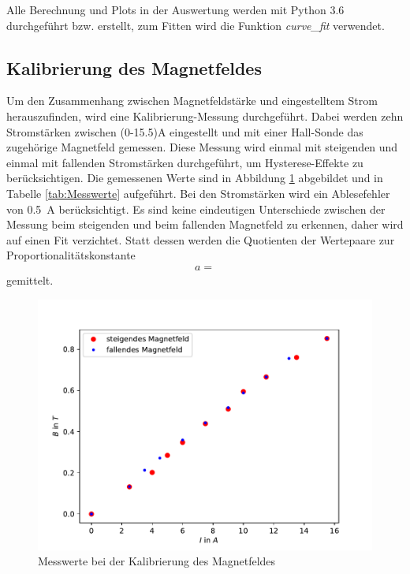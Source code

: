 Alle Berechnung und Plots in der Auswertung werden mit Python 3.6 durchgeführt bzw. erstellt, zum Fitten wird die Funktion \textit{curve\_fit} verwendet.

\subsection{Kalibrierung des Magnetfeldes}
Um den Zusammenhang zwischen Magnetfeldstärke und eingestelltem Strom herauszufinden, wird eine Kalibrierung-Messung durchgeführt. Dabei werden zehn Stromstärken zwischen (0-15.5)\si{\ampere} eingestellt und mit einer Hall-Sonde das zugehörige Magnetfeld gemessen. Diese Messung wird einmal mit steigenden und einmal mit fallenden Stromstärken durchgeführt, um Hysterese-Effekte zu berücksichtigen. Die gemessenen Werte sind in Abbildung \ref{fig:Hysterese} abgebildet und in Tabelle \ref{tab:Messwerte} aufgeführt. Bei den Stromstärken wird ein Ablesefehler von \SI{0.5}{\ampere} berücksichtigt. Es sind keine eindeutigen Unterschiede zwischen der Messung beim steigenden und beim fallenden Magnetfeld zu erkennen, daher wird auf einen Fit verzichtet. Statt dessen werden die Quotienten der Wertepaare zur Proportionalitätskonstante 
\begin{align}
	a = 
\end{align}
gemittelt.

\begin{figure}
	\centering
	\includegraphics[width=\textwidth]{Hysterese.pdf}
	\caption{Messwerte bei der Kalibrierung des Magnetfeldes}
	\label{fig:Hysterese}
\end{figure}


